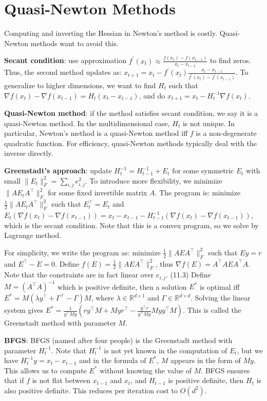 \section{Quasi-Newton Methods}

Computing and inverting the Hessian in Newton's method is costly. Quasi-Newton methods want to avoid this.

\textbf{Secant condition}: use approximation $f^\prime(x_t) \approx \frac{f(x_t) - f(x_{t-1})}{x_t - x_{t-1}}$ to find zeros. Thus, the second method updates as: $x_{t+1} = x_t - f^\prime(x_t) \frac{x_t - x_{t-1}}{f^\prime(x_t) - f^\prime(x_{t-1})}$. To generalize to higher dimensions, we want to find $H_t$ such that $\nabla f(x_t) - \nabla f(x_{t-1}) = H_t(x_t - x_{t-1})$, and do $x_{t+1} = x_t - H_t^{-1} \nabla f(x_t)$.

\textbf{Quasi-Newton method}: if the method satisfies secant condition, we say it is a quasi-Newton method. In the multidimensional case, $H_t$ is not unique. In particular, Newton's method is a quasi-Newton method iff $f$ is a non-degenerate quadratic function. For efficiency, quasi-Newton methods typically deal with the inverse directly.

\textbf{Greenstadt's approach}: update $H_t^{-1} = H_{t-1}^{-1} + E_t$ for some symmetric $E_t$ with small $\|E_t\|_F^2 = \sum_{i,j} e_{i,j}^2$. To introduce more flexibility, we minimize $\|AE_t A^\top\|_F^2$ for some fixed invertible matrix $A$. The program is: minimize $\frac{1}{2}\|AE_t A^\top\|_F^2$ such that $E_t^\top = E_t$ and $E_t (\nabla f(x_t) - \nabla f(x_{t-1})) = x_t - x_{t-1} - H_{t-1}^{-1} (\nabla f(x_t) - \nabla f(x_{t-1}))$, which is the secant condition. Note that this is a convex program, so we solve by Lagrange method.

For simplicity, we write the program as: minimize $\frac{1}{2}\|AE A^\top\|_F^2$ such that $Ey=r$ and $E^\top - E=0$. Define $f(E) = \frac{1}{2}\|AE A^\top\|_F^2$, thus $\nabla f(E) = A^\top A E A^\top A$. Note that the constraints are in fact linear over $e_{i,j}$. (11.3) Define $M = (A^\top A)^{-1}$ which is positive definite, then a solution $E^*$ is optimal iff $E^*  = M(\lambda y^\top + \Gamma^\top - \Gamma)M$, where $\lambda \in \mathbb{R}^{d\times 1}$ and $\Gamma \in \mathbb{R}^{d\times d}$. Solving the linear system gives $E^* = \frac{1}{y^\top M y}(r y^\top M + M y r^\top - \frac{y^\top r}{y^\top M y} Myy^\top M)$. This is called the Greenstadt method with parameter $M$.

\textbf{BFGS}: BFGS (named after four people) is the Greenstadt method with parameter $H_t^{-1}$. Note that $H_t^{-1}$ is not yet known in the computation of $E_t$, but we have $H_t^{-1} y = x_t - x_{t-1}$ and in the formula of $E^*$, $M$ appears in the form of $My$. This allows us to compute $E^*$ without knowing the value of $M$. BFGS ensures that if $f$ is not flat between $x_{t-1}$ and $x_t$, and $H_{t-1}$ is positive definite, then $H_{t}$ is also positive definite. This reduces per iteration cost to $O(d^2)$.

